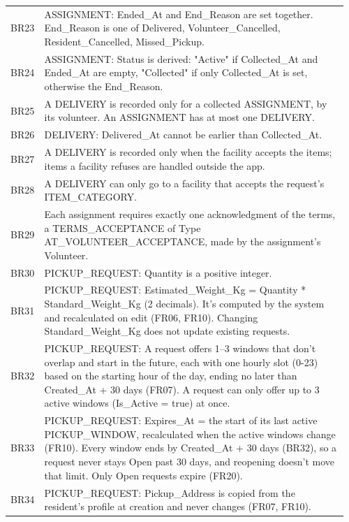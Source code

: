 \begin{longtable}{@{}p{0.07\linewidth}>{\raggedright\arraybackslash}p{0.89\linewidth}@{}}
\addlinespace[2pt]
BR23 & ASSIGNMENT: Ended\_At and End\_Reason are set together. End\_Reason is one of Delivered, Volunteer\_Cancelled, Resident\_Cancelled, Missed\_Pickup. \\
\addlinespace[2pt]
BR24 & ASSIGNMENT: Status is derived: "Active" if Collected\_At and Ended\_At are empty, "Collected" if only Collected\_At is set, otherwise the End\_Reason. \\
\addlinespace[2pt]
BR25 & A DELIVERY is recorded only for a collected ASSIGNMENT, by its volunteer. An ASSIGNMENT has at most one DELIVERY. \\
\addlinespace[2pt]
BR26 & DELIVERY: Delivered\_At cannot be earlier than Collected\_At. \\
\addlinespace[2pt]
BR27 & A DELIVERY is recorded only when the facility accepts the items; items a facility refuses are handled outside the app. \\
\addlinespace[2pt]
BR28 & A DELIVERY can only go to a facility that accepts the request's ITEM\_CATEGORY. \\
\addlinespace[2pt]
BR29 & Each assignment requires exactly one acknowledgment of the terms, a TERMS\_ACCEPTANCE of Type AT\_VOLUNTEER\_ACCEPTANCE, made by the assignment's Volunteer. \\
\addlinespace[2pt]
BR30 & PICKUP\_REQUEST: Quantity is a positive integer. \\
\addlinespace[2pt]
BR31 & PICKUP\_REQUEST: Estimated\_Weight\_Kg = Quantity * Standard\_Weight\_Kg (2 decimals). It's computed by the system and recalculated on edit (FR06, FR10). Changing Standard\_Weight\_Kg does not update existing requests. \\
\addlinespace[2pt]
BR32 & PICKUP\_REQUEST: A request offers 1--3 windows that don't overlap and start in the future, each with one hourly slot (0-23) based on the starting hour of the day, ending no later than Created\_At + 30 days (FR07). A request can only offer up to 3 active windows (Is\_Active = true) at once. \\
\addlinespace[2pt]
BR33 & PICKUP\_REQUEST: Expires\_At = the start of its last active PICKUP\_WINDOW, recalculated when the active windows change (FR10). Every window ends by Created\_At + 30 days (BR32), so a request never stays Open past 30 days, and reopening doesn't move that limit. Only Open requests expire (FR20). \\
\addlinespace[2pt]
BR34 & PICKUP\_REQUEST: Pickup\_Address is copied from the resident's profile at creation and never changes (FR07, FR10). \\

\end{longtable}
